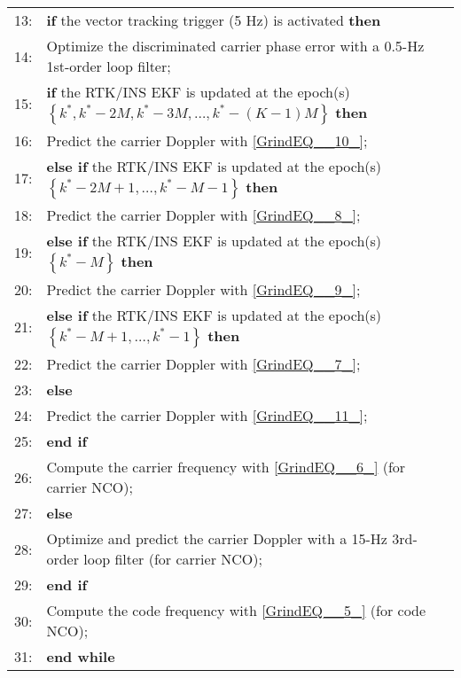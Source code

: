 \documentclass{article}
\begin{document}
\begin{table*}[htbp]
\begin{tabular}{ll}
	13: &     \:\:\:\:\textbf{if} the vector tracking trigger (5 Hz) is activated \textbf{then} \\  
	14: &         \:\:\:\:\:\:\:\:Optimize the discriminated carrier phase error with a 0.5-Hz 1st-order loop filter; \textbf{} \\  
	15: &         \:\:\:\:\:\:\:\:\textbf{if} the RTK/INS EKF is updated at the epoch(s) $\left\{k^*,k^*-2M,k^*-3M,\dots ,k^*-\left(K-1\right)M\right\}$ \textbf{then} \\  
	16: &             \:\:\:\:\:\:\:\:\:\:\:\:Predict the carrier Doppler with \eqref{GrindEQ__10_}; \\  
	17: &         \:\:\:\:\:\:\:\:\textbf{else if} the RTK/INS EKF is updated at the epoch(s) $\left\{k^*-2M+1,\dots ,k^*-M-1\right\}$ \textbf{then} \\  
	18: &             \:\:\:\:\:\:\:\:\:\:\:\:Predict the carrier Doppler with \eqref{GrindEQ__8_}; \\  
	19: &         \:\:\:\:\:\:\:\:\textbf{else if} the RTK/INS EKF is updated at the epoch(s) $\left\{k^*-M\right\}$ \textbf{then} \\  
	20: &             \:\:\:\:\:\:\:\:\:\:\:\:Predict the carrier Doppler with \eqref{GrindEQ__9_}; \\  
	21: &         \:\:\:\:\:\:\:\:\textbf{else if }the RTK/INS EKF is updated at the epoch(s) $\left\{k^*-M+1,\dots ,k^*-1\right\}$ \textbf{then} \\  
	22: &             \:\:\:\:\:\:\:\:\:\:\:\:Predict the carrier Doppler with \eqref{GrindEQ__7_}; \\  
	23: &         \:\:\:\:\:\:\:\:\textbf{else} \\  
	24: &             \:\:\:\:\:\:\:\:\:\:\:\:Predict the carrier Doppler with \eqref{GrindEQ__11_}; \\  
	25: &         \:\:\:\:\:\:\:\:\textbf{end if} \\  
	26: &         \:\:\:\:\:\:\:\:Compute the carrier frequency with \eqref{GrindEQ__6_} (for carrier NCO); \\  
	27: &     \:\:\:\:\textbf{else } \\  
	28: &         \:\:\:\:\:\:\:\:Optimize and predict the carrier Doppler with a 15-Hz 3rd-order loop filter (for carrier NCO); \\  
	29: &     \:\:\:\:\textbf{end if} \\  
	30: &     \:\:\:\:Compute the code frequency with \eqref{GrindEQ__5_} (for code NCO);  \\  
	31: & \textbf{end while} \\  
	\bottomrule
	\end{tabular}
	\label{tab:alg1}
\end{table*}
\end{document}
